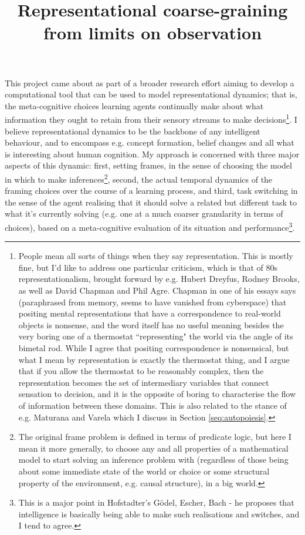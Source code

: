 \documentclass{article}
\title{Representational coarse-graining from limits on observation}
\begin{document}
\maketitle

This project came about as part of a broader research effort aiming to develop a computational tool that can be used to model representational dynamics; that is, the meta-cognitive choices learning agents continually make about what information they ought to retain from their sensory streams to make decisions\footnote{ People mean all sorts of things when they say representation. This is mostly fine, but I'd like to address one particular criticism, which is that of 80s representationalism, brought forward by e.g. Hubert Dreyfus, Rodney Brooks, as well as David Chapman and Phil Agre\cite{agre1987pengi}. Chapman in one of his essays says (paraphrased from memory, seems to have vanished from cyberspace) that positing mental representations that have a correspondence to real-world objects is nonsense, and the word itself has no useful meaning besides the very boring one of a thermostat ``representing" the world via the angle of its bimetal rod. While I agree that positing correspondence is nonsensical, but what I mean by representation is exactly the thermostat thing, and I argue that if you allow the thermostat to be reasonably complex, then the representation becomes the set of intermediary variables that connect sensation to decision, and it is the opposite of boring to characterise the flow of information between these domains. This is also related to the stance of e.g. Maturana and Varela which I discuss in Section \ref{seq:autopoiesis}.}. I believe representational dynamics to be the backbone of any intelligent behaviour, and to encompass e.g. concept formation, belief changes and all what is interesting about human cognition. My approach is concerned with three major aspects of this dynamic: first, setting frames, in the sense of choosing the model in which to make inferences\footnote{The original frame problem is defined in terms of predicate logic, but here I mean it more generally, to choose any and all properties of a mathematical model to start solving an inference problem with (regardless of those being about some immediate state of the world or choice or some structural property of the environment, e.g. causal structure), in a big world\cite{javed2024big}.}, second, the actual temporal dynamics of the framing choices over the course of a learning process, and third, task switching in the sense of the agent realising that it should solve a related but different task to what it's currently solving (e.g. one at a much coarser granularity in terms of choices), based on a meta-cognitive evaluation of its situation and performance\footnote{This is a major point in Hofstadter's G\"odel, Escher, Bach\cite{hofstadter1999godel} - he proposes that intelligence is basically being able to make such realisations and switches, and I tend to agree.}.
\end{document}
